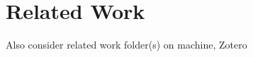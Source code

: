 \chapter{Related Work}\label{chapter:relatedwork}









Also consider related work folder(s) on machine, Zotero

